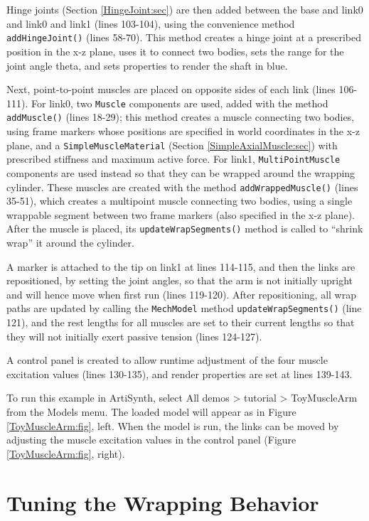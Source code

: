 Hinge joints (Section \ref{HingeJoint:sec}) are then added between the base and
link0 and link0 and link1 (lines 103-104), using the convenience method {\tt
addHingeJoint()} (lines 58-70). This method creates a hinge joint at a prescribed
position in the x-z plane, uses it to connect two bodies, sets the range for
the joint angle {\sf theta}, and sets properties to render the shaft in blue.

Next, point-to-point muscles are placed on opposite sides of each link (lines
106-111). For link0, two {\tt Muscle} components are used, added with the
method {\tt addMuscle()} (lines 18-29); this method creates a muscle connecting
two bodies, using frame markers whose positions are specified in world
coordinates in the x-z plane, and a {\tt SimpleMuscleMaterial}
(Section \ref{SimpleAxialMuscle:sec}) with prescribed stiffness and maximum
active force. For link1, {\tt MultiPointMuscle} components are used instead so
that they can be wrapped around the wrapping cylinder. These muscles are created
with the method {\tt addWrappedMuscle()} (lines 35-51), which creates a
multipoint muscle connecting two bodies, using a single wrappable segment
between two frame markers (also specified in the x-z plane). After the muscle
is placed, its {\tt updateWrapSegments()} method is called to ``shrink wrap''
it around the cylinder.

A marker is attached to the tip on link1 at lines 114-115, and then the links
are repositioned, by setting the joint angles, so that the arm is not initially
upright and will hence move when first run (lines 119-120). After
repositioning, all wrap paths are updated by calling the {\tt MechModel} method
{\tt updateWrapSegments()} (line 121), and the rest lengths for all muscles are
set to their current lengths so that they will not initially exert passive
tension (lines 124-127).

A control panel is created to allow runtime adjustment of the four muscle
excitation values (lines 130-135), and render properties are set at lines
139-143.

To run this example in ArtiSynth, select {\sf All demos > tutorial >
ToyMuscleArm} from the {\sf Models} menu. The loaded model will appear as in
Figure \ref{ToyMuscleArm:fig}, left. When the model is run, the links can be
moved by adjusting the muscle excitation values in the control panel
(Figure \ref{ToyMuscleArm:fig}, right).

\section{Tuning the Wrapping Behavior}
\label{wrapTuning:sec}

